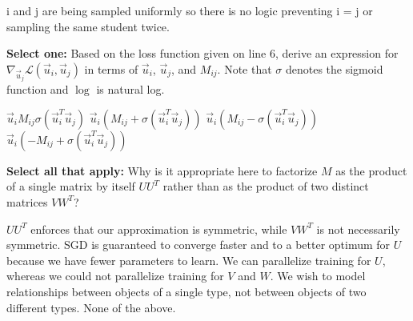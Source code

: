 \documentclass[11pt,addpoints,answers]{exam}
\newcommand{\sall}{\textbf{Select all that apply: }}
\newcommand{\sone}{\textbf{Select one: }}
\begin{document}
\begin{questions}
\begin{parts}
\begin{subparts}
    \begin{your_solution}[title=Explanation, height=3cm, width=0.9\textwidth]
    i and j are being sampled uniformly so there is no logic preventing i = j or sampling the same 
    student twice.
    \end{your_solution}

\subpart[1] \sone Based on the loss function given on line 6, derive an expression for $\nabla_{\vec{u}_j} \mathcal{L}(\vec{u}_i, \vec{u}_j)$ in terms of $\vec{u}_i$, $\vec{u}_j$, and $M_{ij}$. Note that $\sigma$ denotes the sigmoid function and $\log$ is natural log.
    \begin{checkboxes}
    \choice $\vec{u}_i M_{ij} \sigma(\vec{u}_i^T \vec{u}_j)$
    \choice $\vec{u}_i(M_{ij} + \sigma(\vec{u}_i^T \vec{u}_j))$
    \CorrectChoice $\vec{u}_i(M_{ij} - \sigma(\vec{u}_i^T \vec{u}_j))$
    \choice $\vec{u}_i(-M_{ij} + \sigma(\vec{u}_i^T \vec{u}_j))$
    \end{checkboxes}
         
    

\subpart[2] \sall Why is it appropriate here to factorize $M$ as the product of a single matrix by itself $U U^T$ rather than as the product of two distinct matrices $VW^T$?
    {\checkboxchar{$\Box$} \checkedchar{$\blacksquare$}
    \begin{checkboxes}
    \CorrectChoice $U U^T$ enforces that our approximation is symmetric, while $VW^T$ is not necessarily symmetric.
    \choice SGD is guaranteed to converge faster and to a better optimum for $U$ because we have fewer parameters to learn.
    \choice We can parallelize training for $U$, whereas we could not parallelize training for $V$ and $W$.
    \choice We wish to model relationships between objects of a single type, not between objects of two different types.
    \choice None of the above.
    \end{checkboxes}
    }
    

\end{subparts}

\end{parts}
    \newpage
\newpage

\end{questions}
\end{document}

